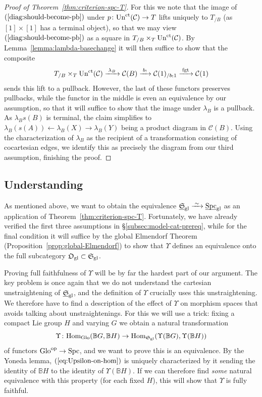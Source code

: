 \documentclass[reqno]{memo-l}
\theoremstyle{mythm}
\theoremstyle{definition}
\numberwithin{equation}{section}
\newcommand{\Cc}{{\mathcal{C}}}
\newcommand{\gl}{\textup{gl}}
\DeclareMathOperator{\Spc}{Spc}
\renewcommand{\hom}{\textup{hom}}
\newcommand{\op}{{\textup{op}}}
\renewcommand{\hom}{{\textup{Hom}}}
\newcommand{\fgt}{\textup{fgt}}
\newcommand{\ct}{\textup{ct}}
\newcommand{\Un}{\textup{Un}}
\newcommand{\Glo}{\textup{Glo}}
\newcommand{\BGcat}[1]{\mathbb B{#1}}
\newcommand{\ulhelper}[2]{\underline{\setbox0=\hbox{$#1#2$}\dp0=0.4pt \box0\relax}}
\newcommand{\ul}[1]{{\mathpalette\ulhelper{#1}}\hbox{\rule[-2pt]{0pt}{0pt}}}
\newcommand{\iso}{\xrightarrow{\;\smash{\raisebox{-0.25ex}{\ensuremath{\scriptstyle\sim}}}\;}}
\newcommand{\myS}{{{\mathfrak S\kern-.4pt}}}
\begin{document}
\begin{proof}[Proof of Theorem~\ref{thm:criterion-spc-T}]
    For this we note that the image of $(\ref{diag:should-become-pb})$ under $p\colon\Un^\ct(\Cc)\to T$ lifts uniquely to $T_{/B}$ (as $[1]\times[1]$ has a terminal object), so that we may view $(\ref{diag:should-become-pb})$ as a square in $T_{/B}\times_T\Un^\ct(\Cc)$. By Lemma~\ref{lemma:lambda-basechange} it will then suffice to show that the composite
    \[
        T_{/B}\times_T\Un^\ct(\Cc)\xrightarrow{\;\lambda_B\;}\Cc(B)\xrightarrow{\;b_!\;}\Cc(1)_{/b_!1}\xrightarrow{\;\fgt\;}\Cc(1)
    \]
    sends this lift to a pullback. However, the last of these functors preserves pullbacks, while the functor in the middle is even an equivalence by our assumption, so that it will suffice to show that the image under $\lambda_B$ is a pullback. As $\lambda_Bs(B)$ is terminal, the claim simplifies to $\lambda_B(s(A))\gets\lambda_B(X)\to\lambda_B(Y)$ being a product diagram in $\Cc(B)$. Using the characterization of $\lambda_B$ as the recipient of a transformation consisting of cocartesian edges, we identify this as precisely the diagram from our third assumption, finishing the proof.
\end{proof}

\subsection{Understanding }\label{subsec:Upsilon} As mentioned above, we want to obtain the equivalence $\ul\myS_\gl\iso\ul\Spc_\gl$ as an application of Theorem~\ref{thm:criterion-spc-T}. Fortunately, we have already verified the first three assumptions in §\ref{subsec:model-cat-prereq}, while for the final condition it will suffice by the global Elmendorf Theorem (Proposition~\ref{prop:global-Elmendorf}) to show that $\Upsilon$ defines an equivalence onto the full subcategory $\mathfrak O_\gl\subset\myS_\gl$.

Proving full faithfulness of $\Upsilon$ will be by far the hardest part of our argument. The key problem is once again that we do not understand the cartesian unstraightening of $\ul\myS_\gl$, and the definition of $\Upsilon$ crucially uses this unstraightening. We therefore have to find a description of the effect of $\Upsilon$ on morphism spaces that avoids talking about unstraightenings. For this we will use a trick: fixing a compact Lie group $H$ and varying $G$ we obtain a natural transformation
\begin{equation}\label{eq:Upsilon-on-hom}
    \Upsilon\colon\hom_{\Glo}(\BGcat{G},\BGcat{H})\to\hom_{\myS_\gl}(\Upsilon(\BGcat{G}),\Upsilon(\BGcat{H}))
\end{equation}
of functors $\Glo^\op\to\Spc$, and we want to prove this is an equivalence. By the Yoneda lemma, $(\ref{eq:Upsilon-on-hom})$ is uniquely characterized by it sending the identity of $\BGcat{H}$ to the identity of $\Upsilon(\BGcat{H})$. If we can therefore find \emph{some} natural equivalence with this property (for each fixed $H$), this will show that $\Upsilon$ is fully faithful.
\end{document}
